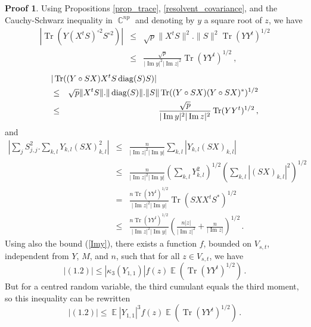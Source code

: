 \documentclass[11pt,a4paper]{article}
\DeclareMathOperator{\E}{\mathbb{E}}
\DeclareMathOperator{\C}{\mathbb{C}}
\DeclareMathOperator{\1}{\mathbf{1}}
\DeclareMathOperator{\Imag}{\mathrm{Im}}
\DeclareMathOperator{\Tr}{\mathrm{Tr}}
\DeclareMathOperator{\diag}{\mathrm{diag}}
\theoremstyle{definition}
\newtheorem*{Proof}{Proof}
\begin{document}
\begin{Proof}
Using Propositions \ref{prop_trace}, \ref{resolvent_covariance}, and the Cauchy-Schwarz inequality in $\C^{np}$ and denoting by $y$ a square root of $z$, we have
\begin{eqnarray*}
|\Tr( Y(X^tS)^{\circ 2} S^{\circ 2} )| & \le & \sqrt{p} \|X^tS\|^2.\|S\|^2 \Tr(YY^t)^{1/2} \\
& \le & \frac{\sqrt{p}}{|\Imag y|^2 |\Imag z|^2} \Tr(YY^t)^{1/2} \ ,
\end{eqnarray*}
\begin{eqnarray*}
\lefteqn{   |\Tr( (Y \circ SX)X^tS\diag(S)S )|   } \\
& \le & \sqrt{p} \|X^tS\|.\|\diag(S)\|.\|S\| \Tr((Y \circ SX)(Y \circ SX)^*)^{1/2} \\
& \le & \frac{\sqrt{p}}{|\Imag y|^2 |\Imag z|^2} \Tr(YY^t)^{1/2} \, ,
\end{eqnarray*}
and
\begin{eqnarray*}
\left| \sum_j S_{j,j}^2 . \sum_{k,l} Y_{k,l} (SX)_{k,l}^2 \right|
& \le & \frac{n}{|\Imag z|^2 |\Imag y|} \sum_{k,l} |Y_{k,l} (SX)_{k,l}| \\
& \le & \frac{n}{|\Imag z|^2 |\Imag y|} \left( \sum_{k,l} Y_{k,l}^2 \right)^{1/2} \left( \sum_{k,l} |(SX)_{k,l}|^2 \right)^{1/2} \\
& = & \frac{n \Tr(YY^t)^{1/2}}{|\Imag z|^2 |\Imag y|} \Tr(SXX^tS^*)^{1/2} \\
& \le & \frac{n \Tr(YY^t)^{1/2}}{|\Imag z|^2 |\Imag y|} \left( \frac{n|z|}{|\Imag z|^2} + \frac{n}{|\Imag z|} \right)^{1/2} \, .
\end{eqnarray*}
Using also the bound (\ref{Imy}), there exists a function $f$, bounded on $V_{s,t}$, independent from $Y$, $M$, and $n$, such that for all $z \in V_{s,t}$, we have
\begin{displaymath}
|(1.2)| \le |\kappa_3(Y_{1,1})| f(z) \E (\Tr(YY^t)^{1/2}) \, .
\end{displaymath}
But for a centred random variable, the third cumulant equals the third moment, so this inequality can be rewritten
\begin{displaymath}
|(1.2)| \le \E|Y_{1,1}|^3 f(z) \E (\Tr(YY^t)^{1/2}) \, .
\end{displaymath}


\end{Proof}
\end{document}
